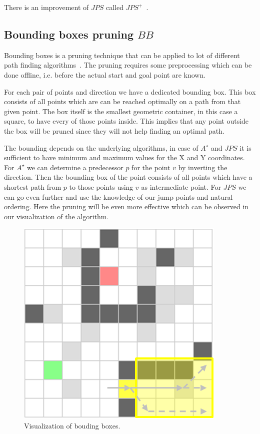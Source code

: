 \documentclass{article}
\begin{document}
    There is an improvement of $JPS$ called $JPS^+$~\cite{DBLP:conf/aips/HaraborG14}.



    \subsection{Bounding boxes pruning $BB$}

    Bounding boxes is a pruning technique that can be applied to lot of different path finding algorithms~\cite{DBLP:conf/aaai/RabinS16}. The pruning requires some preprocessing which can be done offline, i.e. before the actual start and goal point are known.

    For each pair of points and direction we have a dedicated bounding box. This box consists of all points which are can be reached optimally on a path from that given point. The box itself is the smallest geometric container, in this case a square, to have every of those points inside. This implies that any point outside the box will be pruned since they will not help finding an optimal path.

    The bounding depends on the underlying algorithms, in case of $A^\star$ and $JPS$ it is sufficient to have minimum and maximum values for the X and Y coordinates. For $A^\star$ we can determine a predecessor $p$ for the point $v$ by inverting the direction. Then the bounding box of the point consists of all points which have a shortest path from $p$ to those points using $v$ as intermediate point. For $JPS$ we can go even further and use the knowledge of our jump points and natural ordering. Here the pruning will be even more effective which can be observed in our visualization of the algorithm.

    \begin{figure}[!htb]
        \centering
        \includegraphics{figures/bounding_boxes.png}
        \caption{Visualization of bouding boxes.}
        \label{fig:bounding_boxes}
    \end{figure}
\end{document}
